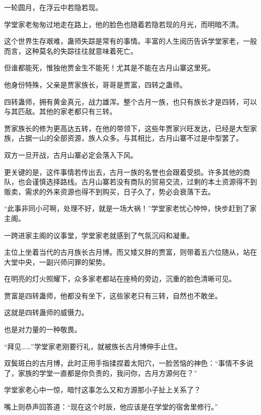 
\begin{this_body}



一轮圆月，在浮云中若隐若现。

学堂家老匆匆过地走在路上，他的脸色也随着若隐若现的月光，而明暗不清。

这个世界生存艰难，蛊师失踪是常有的事情。丰富的人生阅历告诉学堂家老，一般而言，这种莫名的失踪往往就意味着死亡。

但谁都能死，惟独他贾金生不能死！尤其是不能在古月山寨这里死。

他身份特殊，父亲是贾家族长，哥哥是贾富，四转之蛊师。

四转蛊师，拥有黄金真元，战力雄浑。整个古月一族，也只有族长才是四转，可以与其匹敌。其他的家老都只有三转。

贾家族长的修为更高达五转，在他的带领下，这些年贾家兴旺发达，已经是大型家族，占据一山的全部资源，族人众多。与其相比，古月山寨不过是中型罢了。

双方一旦开战，古月山寨必定会落入下风。

更关键的是，这件事情若传出去，古月一族的名誉也会跟着受损。许多其他的商队，也会谨慎选择路线。古月山寨若没有商队的贸易交流，过剩的本土资源得不到贩卖，需求的外来资源也得不到购买，日子久了，势必会衰落下去。

“此事非同小可啊，处理不好，就是一场大祸！”学堂家老忧心忡忡，快步赶到了家主阁。

一跨进家主阁的议事堂，学堂家老就感到了气氛沉闷和凝重。

主位上坐着当代的古月族长古月博。而又矮又胖的贾富，则带着五六位随从，站在大堂中央，一副兴师问罪的架势。

在明亮的灯火照耀下，众多家老都站在座椅的旁边，沉重的脸色清晰可见。

贾富是四转蛊师，他都没有坐下，这些家老只有三转，自然也不敢坐。

这就是四转蛊师的威慑力。

也是对力量的一种敬畏。

“拜见……”学堂家老刚要行礼，就被族长古月博伸手止住。

双鬓斑白的古月博，此时正用手指揉捏着太阳穴，一脸苦恼的神色：“事情不多说了，家族的学堂一直都是你负责的，我问你，古月方源何在？”

学堂家老心中一惊，暗忖这事怎么又和方源那小子扯上关系了？

嘴上则恭声回答道：“现在这个时辰，他应该是在学堂的宿舍里修行。”


\end{this_body}
